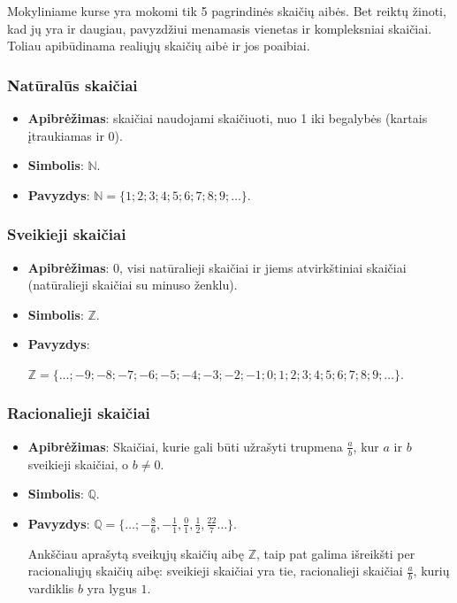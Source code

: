 \documentclass[a4paper]{article}
\begin{document}
Mokyliniame kurse yra mokomi tik 5 pagrindinės skaičių aibės. Bet reiktų
žinoti, kad jų yra ir daugiau, pavyzdžiui menamasis vienetas ir kompleksniai
skaičiai. Toliau apibūdinama realiųjų skaičių aibė ir jos poaibiai.

\subsubsection{Natūralūs skaičiai}

\begin{itemize}
      \item \textbf{Apibrėžimas}: skaičiai naudojami skaičiuoti, nuo 1 iki
            begalybės (kartais įtraukiamas ir 0).
      \item \textbf{Simbolis}: $\mathbb{N}$.
      \item \textbf{Pavyzdys}: $\mathbb{N}=\{1;2;3;4;5;6;7;8;9;\ldots\}$.
\end{itemize}

\subsubsection{Sveikieji skaičiai}

\begin{itemize}
      \item \textbf{Apibrėžimas}: 0, visi natūralieji skaičiai ir jiems
            atvirkštiniai skaičiai (natūralieji skaičiai su minuso ženklu).
      \item \textbf{Simbolis}: $\mathbb{Z}$.
      \item \textbf{Pavyzdys}:

            $\mathbb{Z}=\{\ldots;-9;-8;-7;-6;-5;-4;-3;-2;-1;0;1;2;3;4;5;6;7;8;9;\ldots\}$.
\end{itemize}

\subsubsection{Racionalieji skaičiai}

\begin{itemize}
      \item \textbf{Apibrėžimas}: Skaičiai, kurie gali būti užrašyti trupmena
            $\frac{a}{b}$, kur $a$ ir $b$ sveikieji skaičiai, o $b \neq 0$.
      \item \textbf{Simbolis}: $\mathbb{Q}$.
      \item \textbf{Pavyzdys}: $\mathbb{Q}=\{\ldots;-\frac{8}{6}, -\frac{1}{1},
                  \frac{0}{1}, \frac{1}{2}, \frac{22}{7}\ldots\}$.

            Ankščiau aprašytą sveikųjų skaičių aibę $\mathbb{Z}$, taip pat
            galima
            išreikšti per racionaliųjų skaičių aibę: sveikieji skaičiai yra
            tie,
            racionalieji skaičiai $\frac{a}{b}$, kurių vardiklis $b$ yra lygus
            $1$.
\end{itemize}
\end{document}

